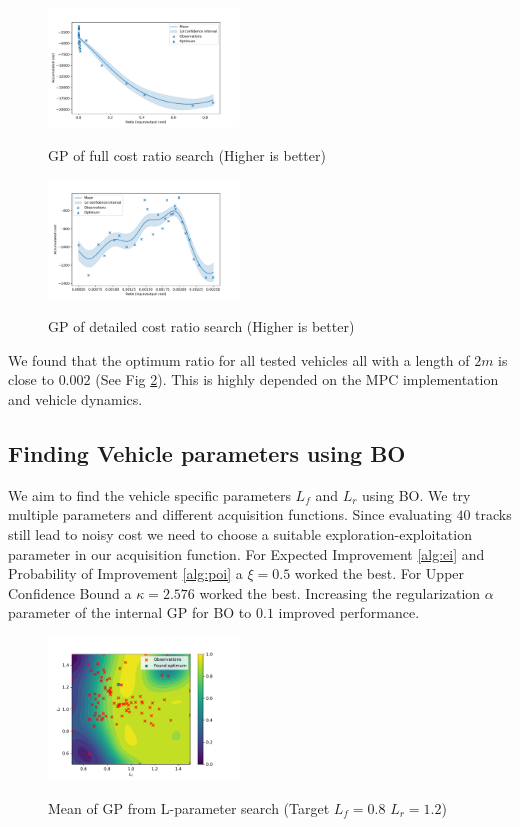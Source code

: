 \documentclass[twoside,twocolumn]{article}
\begin{document}
\begin{figure}[h]
    \caption{GP of full cost ratio search (Higher is better)}
    \centering
    \includegraphics[width=0.45\textwidth]{fig_cost_ratio_full.pdf}
    \label{fig:cost_ratio_full}
\end{figure}

\begin{figure}[h]
    \caption{GP of detailed cost ratio search (Higher is better)}
    \centering
    \includegraphics[width=0.45\textwidth]{fig_cost_ratio_detail.pdf}
    \label{fig:cost_ratio_detail}
\end{figure}

We found that the optimum ratio for all tested vehicles all with a length of $2m$ is close to $0.002$ (See Fig \ref{fig:cost_ratio_detail}). This is highly depended on the MPC implementation and vehicle dynamics.

\subsection{Finding Vehicle parameters using BO}

We aim to find the vehicle specific parameters $L_f$ and $L_r$ using BO. We try multiple parameters and different acquisition functions. Since evaluating $40$ tracks still lead to noisy cost we need to choose a suitable exploration-exploitation parameter in our acquisition function. For Expected Improvement \ref{alg:ei} and Probability of Improvement \ref{alg:poi} a $\xi = 0.5$ worked the best. For Upper Confidence Bound a $\kappa=2.576$ worked the best. Increasing the regularization $\alpha$ parameter of the internal GP for BO to $0.1$ improved performance.

\begin{figure}[h]
    \caption{Mean of GP from L-parameter search (Target $L_f = 0.8$ $L_r = 1.2$)}
    \centering
    \includegraphics[width=0.45\textwidth]{fig_l_estimation_full.pdf}
    \label{fig:l_param_full}
\end{figure}
\end{document}
